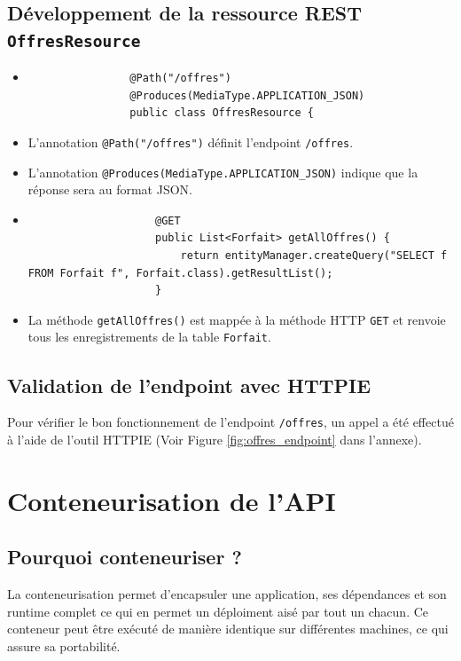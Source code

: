 \documentclass[11pt]{article}
\begin{document}
		\subsection*{Développement de la ressource REST \texttt{OffresResource}}
		
		\begin{itemize}
			\item \begin{lstlisting}
				@Path("/offres")
				@Produces(MediaType.APPLICATION_JSON)
				public class OffresResource {
				\end{lstlisting}
				\item L'annotation \texttt{@Path("/offres")} définit l'endpoint \texttt{/offres}.
				\item L'annotation \texttt{@Produces(MediaType.APPLICATION\_JSON)} indique que la réponse sera au format JSON.
				
				\item \begin{lstlisting}
					@GET
					public List<Forfait> getAllOffres() {
						return entityManager.createQuery("SELECT f FROM Forfait f", Forfait.class).getResultList();
					}
				\end{lstlisting}
				\item La méthode \texttt{getAllOffres()} est mappée à la méthode HTTP \texttt{GET} et renvoie tous les enregistrements de la table \texttt{Forfait}.
			\end{itemize}
	
		\subsection*{Validation de l'endpoint avec HTTPIE}
		
		Pour vérifier le bon fonctionnement de l'endpoint \texttt{/offres}, un appel a été effectué à l'aide de l'outil HTTPIE (Voir Figure \ref{fig:offres_endpoint} dans l'annexe).
		
		\section{Conteneurisation de l'API}
		
		\subsection*{Pourquoi conteneuriser ?}
		
		La conteneurisation permet d'encapsuler une application, ses dépendances et son runtime complet ce qui en permet un déploiment aisé par tout un chacun. Ce conteneur peut être exécuté de manière identique sur différentes machines, ce qui assure sa portabilité.
		
\end{document}
